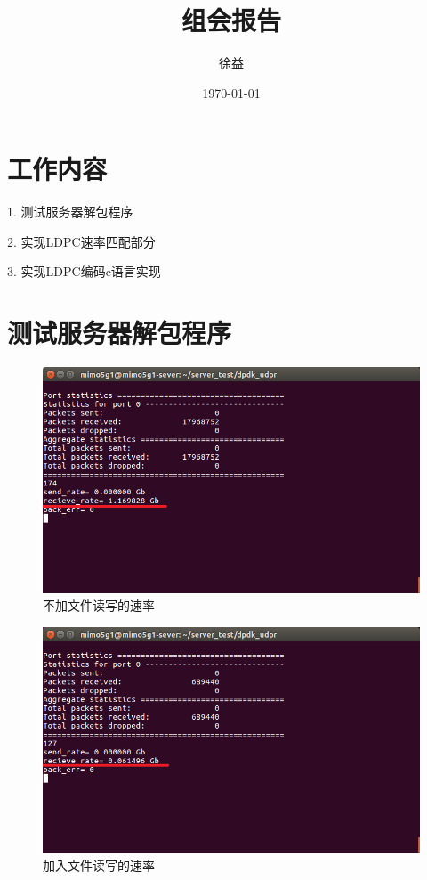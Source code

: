 \documentclass{article}
\title{组会报告}
\author{徐益}
\date{\today}
\begin{document}
\maketitle


\section{工作内容}

1. 测试服务器解包程序

2. 实现LDPC速率匹配部分

3. 实现LDPC编码c语言实现

\section{测试服务器解包程序}

\begin{figure}[H]
	\centering
	\includegraphics[width = .9\textwidth]{max_rate.png}
	\caption{不加文件读写的速率}
\end{figure}

\begin{figure}[H]
	\centering
	\includegraphics[width = .9\textwidth]{min_rate.png}
	\caption{加入文件读写的速率}
\end{figure}
\end{document}
